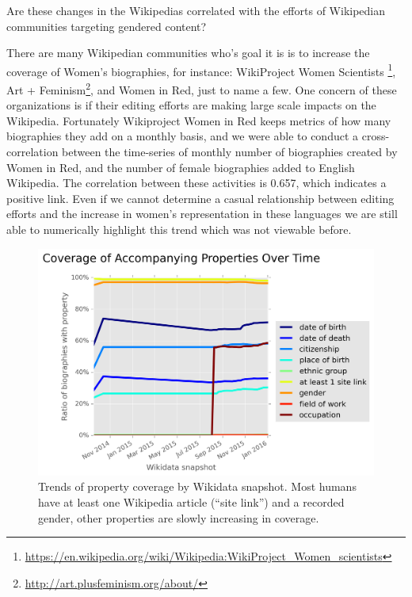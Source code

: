 \documentclass{sig-alternate-05-2015}
\begin{document}
Are these changes in the Wikipedias correlated with the efforts of Wikipedian communities targeting gendered content?

There are many Wikipedian communities who's goal it is is to increase the coverage of Women's biographies, for instance: Wiki\-Project Women Scientists \footnote{\url{https://en.wikipedia.org/wiki/Wikipedia:WikiProject_Women_scientists}}, Art + Feminism\footnote{\url{http://art.plusfeminism.org/about/}}, and Women in Red, just to name a few. One concern of these organizations is if their editing efforts are making large scale impacts on the Wikipedia. Fortunately Wikiproject Women in Red keeps metrics of how many biographies they add on a monthly basis, and we were able to conduct a cross-correlation between the time-series of monthly number of biographies created by Women in Red, and the number of female biographies added to English Wikipedia. The correlation between these activities is 0.657, which indicates a positive link. Even if we cannot determine a casual relationship between editing efforts and the increase in women's representation in these languages we are still able to numerically highlight this trend which was not viewable before.

\begin{figure}
\includegraphics[width=\columnwidth]{figures/additionalprops.png} 
\caption{Trends of property coverage by Wikidata snapshot. Most humans have at least one Wikipedia article (``site link'') and a recorded gender, other properties are slowly increasing in coverage.}
\label{fig:accompanying}
\end{figure}
\end{document}
